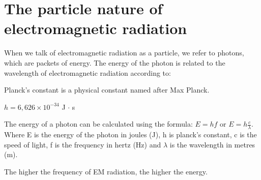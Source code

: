             \section{The particle nature of electromagnetic radiation}
            \nopagebreak
      \label{m38778*id188832}When we talk of electromagnetic radiation as a particle, we refer to photons, which are packets of energy. The energy of the photon is related to the wavelength of electromagnetic radiation according to:\par 
\label{m38778*fhsst!!!underscore!!!id476} { \label{m38778*meaningfhsst!!!underscore!!!id476}
      \label{m38778*id188843}Planck's constant is a physical constant named after Max Planck.\par 
      \label{m38778*id188849}$h=6,626\ensuremath{\times}{10}^{-34}$ J $\ensuremath{\cdot}$ s
 \par 
       } 
      \label{m38778*id188898}The energy of a photon can be calculated using the formula: $E=hf$ or $E=h\frac{c}{\lambda }$.
Where E is the energy of the photon in joules (J), h is planck's constant, c is the speed of light, f is the frequency in hertz (Hz) and $\lambda $ is the wavelength in metres (m).\par The higher the frequency of EM radiation, the higher the energy. 
    
